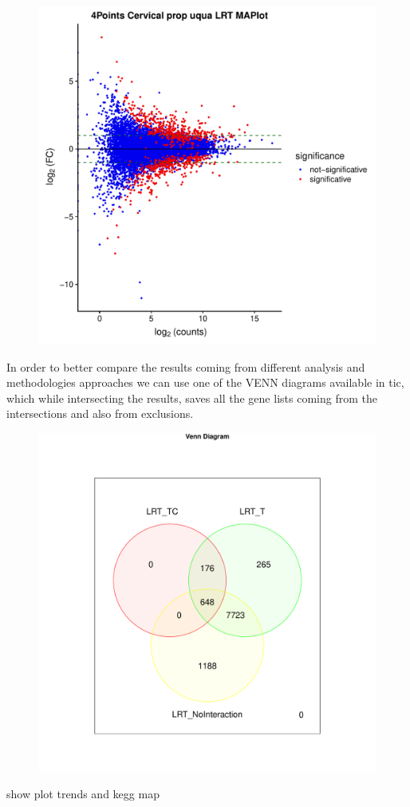 \begin{figure}[H]
\includegraphics[width=\textwidth,height=\textheight,keepaspectratio]{img/ticorser/de/volcma.pdf}
\caption[ticorser Volcano-MA plots]{}
\label{fig:ticorserfiltering}
\centering
\end{figure}

In order to better compare the results coming from different analysis and methodologies approaches we can use one of the VENN diagrams available in \gls{tic}, which while intersecting the results, saves all the gene lists coming from the intersections and also from exclusions.

\begin{figure}[H]
\includegraphics[width=\textwidth,height=\textheight,keepaspectratio]{img/ticorser/de/venn3.pdf}
\caption[ticorser venn diagram]{}
\label{fig:ticorserfiltering}
\centering
\end{figure}

show plot trends and kegg map





